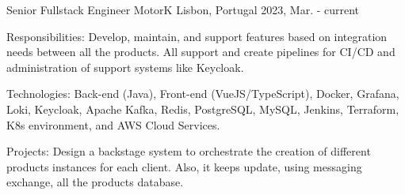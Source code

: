 

\begin{cventries}
  \cventry
    {Senior Fullstack Engineer} %
    {MotorK} %
    {Lisbon, Portugal} %
    {2023, Mar. - current} %
    {
      \begin{cvitems} %
        \item {Responsibilities: Develop, maintain, and support features based on integration needs between all the products. All support and create pipelines for CI/CD and administration of support systems like Keycloak.}
        \item {Technologies: Back-end (Java), Front-end (VueJS/TypeScript), Docker, Grafana, Loki, Keycloak, Apache Kafka, Redis, PostgreSQL, MySQL, Jenkins, Terraform, K8s environment, and AWS Cloud Services.}
        \item {Projects: Design a backstage system to orchestrate the creation of different products instances for each client. Also, it keeps update, using messaging exchange, all the products database.}
      \end{cvitems}
    }


\end{cventries}

